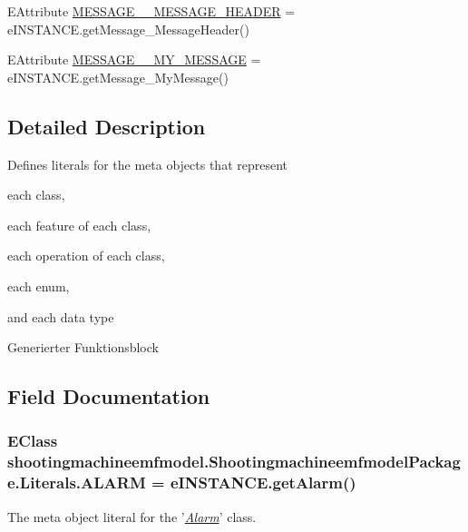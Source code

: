 \begin{DoxyCompactItemize}
\item 
E\-Attribute \hyperlink{interfaceshootingmachineemfmodel_1_1_shootingmachineemfmodel_package_1_1_literals_ac9c85c0837360031ccab61c9f987e8c9}{M\-E\-S\-S\-A\-G\-E\-\_\-\-\_\-\-M\-E\-S\-S\-A\-G\-E\-\_\-\-H\-E\-A\-D\-E\-R} = e\-I\-N\-S\-T\-A\-N\-C\-E.\-get\-Message\-\_\-\-Message\-Header()
\item 
E\-Attribute \hyperlink{interfaceshootingmachineemfmodel_1_1_shootingmachineemfmodel_package_1_1_literals_a78d1aca63746e19f5af0adee1d42af50}{M\-E\-S\-S\-A\-G\-E\-\_\-\-\_\-\-M\-Y\-\_\-\-M\-E\-S\-S\-A\-G\-E} = e\-I\-N\-S\-T\-A\-N\-C\-E.\-get\-Message\-\_\-\-My\-Message()
\end{DoxyCompactItemize}


\subsection{Detailed Description}
Defines literals for the meta objects that represent 
\begin{DoxyItemize}
\item each class, 
\item each feature of each class, 
\item each operation of each class, 
\item each enum, 
\item and each data type 
\end{DoxyItemize}

Generierter Funktionsblock 

\subsection{Field Documentation}
\hypertarget{interfaceshootingmachineemfmodel_1_1_shootingmachineemfmodel_package_1_1_literals_a563965a1017bffb037517fdc4bd5a6d5}{
\subsubsection[{A\-L\-A\-R\-M}]{\setlength{\rightskip}{0pt plus 5cm}E\-Class shootingmachineemfmodel.\-Shootingmachineemfmodel\-Package.\-Literals.\-A\-L\-A\-R\-M = e\-I\-N\-S\-T\-A\-N\-C\-E.\-get\-Alarm()}}\label{interfaceshootingmachineemfmodel_1_1_shootingmachineemfmodel_package_1_1_literals_a563965a1017bffb037517fdc4bd5a6d5}
The meta object literal for the '\hyperlink{classshootingmachineemfmodel_1_1impl_1_1_alarm_impl}{{\itshape Alarm}}' class.

